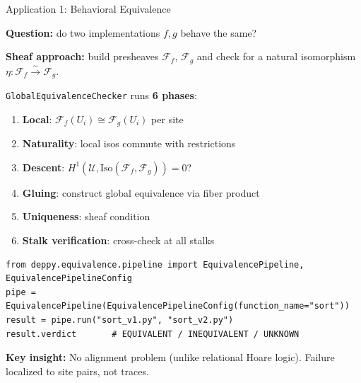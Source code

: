 \documentclass[aspectratio=169,10pt]{beamer}
\newcommand{\Sem}{\mathcal{F}}
\newcommand{\keyinsight}[1]{%
  \vspace{2pt}
  \begin{center}
  \colorbox{sheafbox}{\parbox{0.88\textwidth}{\centering\small\textbf{\textcolor{keyblue}{Key insight:}} #1}}
  \end{center}
  \vspace{-4pt}
}
\begin{document}
\begin{frame}[fragile]{Application 1: Behavioral Equivalence}

\textbf{Question:} do two implementations $f, g$ behave the same?

\vspace{0.15em}
{\small
\textbf{Sheaf approach:} build presheaves $\Sem_f$, $\Sem_g$ and check for a
natural isomorphism $\eta: \Sem_f \xrightarrow{\sim} \Sem_g$.

\vspace{0.15em}
\texttt{GlobalEquivalenceChecker} runs \textbf{6 phases}:
{\footnotesize
\begin{enumerate}
  \item \textbf{Local}: $\Sem_f(U_i) \cong \Sem_g(U_i)$ per site
  \item \textbf{Naturality}: local isos commute with restrictions
  \item \textbf{Descent}: $H^1(\mathcal{U}, \mathrm{Iso}(\Sem_f, \Sem_g)) = 0$?
  \item \textbf{Gluing}: construct global equivalence via fiber product
  \item \textbf{Uniqueness}: sheaf condition
  \item \textbf{Stalk verification}: cross-check at all stalks
\end{enumerate}
}}

\begin{lstlisting}
from deppy.equivalence.pipeline import EquivalencePipeline, EquivalencePipelineConfig
pipe = EquivalencePipeline(EquivalencePipelineConfig(function_name="sort"))
result = pipe.run("sort_v1.py", "sort_v2.py")
result.verdict       # EQUIVALENT / INEQUIVALENT / UNKNOWN
\end{lstlisting}

\keyinsight{No alignment problem (unlike relational Hoare logic). Failure localized to site pairs, not traces.}
\end{frame}
\end{document}
